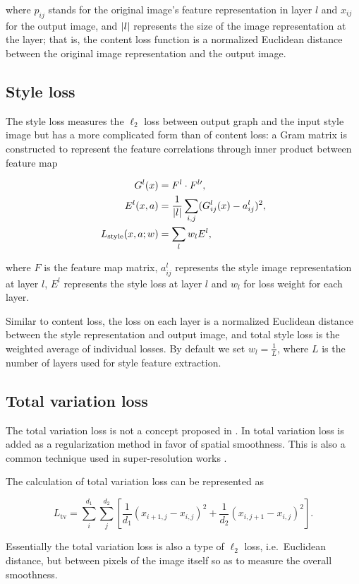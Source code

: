 where $p_{ij}$ stands for the original image's feature representation in layer $l$ and
$x_{ij}$ for the output image,
and $\lvert l\rvert$ represents the size of the image representation at the layer;
that is, the content loss function is a normalized Euclidean distance between the
original image representation and the output image.


\subsection{Style loss}
The style loss measures the $\ell_2$ loss between output graph and the input style image but has a more complicated form than of content loss:
a Gram matrix is constructed to represent the feature correlations through inner product between feature map

	\begin{equation}
	\begin{aligned}
	G^l(x) & = F^l \cdot F^{l\prime}, \\
	E^l(x, a) & = \frac{1}{\lvert l\rvert} \sum_{i, j} (G_{ij}^l(x) - a_{ij}^l)^2, \\
	L_{\text{style}}(x, a; w) & = \sum_{l} w_l E^l,
	\end{aligned}
	\end{equation}

where $F$ is the feature map matrix, $a_{ij}^l$ represents the style image representation at layer $l$,
$E^l$ represents the style loss at layer $l$ and $w_l$ for loss weight for each layer.

Similar to content loss, the loss on each layer is a normalized Euclidean distance between the style representation
and output image, and total style loss is the weighted average of individual losses.
By default we set $w_l = \frac{1}{L}$, where $L$ is the number of layers used for style feature extraction.


\subsection{Total variation loss}
The total variation loss is not a concept proposed in \cite{Gatys:2016gj}.
In \cite{Johnson:2016hp} total variation loss is added as a regularization method
in favor of spatial smoothness.
This is also a common technique used in super-resolution works \cite{aly2005image, zhang2010non}.

The calculation of total variation loss can be represented as

	\begin{equation}
	L_{\text{tv}} = \sum_{i}^{d_1}\sum_{j}^{d_2}\left[ \frac{1}{d_1} (x_{i+1, j} - x_{i, j})^2 + \frac{1}{d_2} (x_{i, j+1} - x_{i, j})^2 \right].
	\end{equation}

Essentially the total variation loss is also a type of $\ell_2$ loss, i.e.\ Euclidean distance,
but between pixels of the image itself so as to measure the overall smoothness.